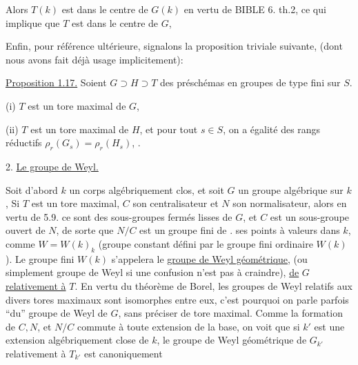 Alors $T(k)$ est dans le centre de $G(k)$ en vertu de BIBLE 6. th.2, ce qui implique que $T$ est dans le centre de $G$, 

Enfin, pour référence ultérieure, signalons la proposition triviale suivante, (dont nous avons fait déjà usage implicitement):

\uline{Proposition 1.17.} Soient $G\supset H\supset T$ des préschémas en groupes de type fini sur $S$. 

(i)  $T$ est un tore maximal de $G$, 

(ii)  $T$ est un tore maximal de $H$, et  pour tout $s\in S$, on a égalité des rangs réductifs $\rho_r(G_s)=\rho_r(H_s)$, .

2. \uline{Le groupe de Weyl.}

Soit d'abord $k$ un corps algébriquement clos, et soit $G$ un groupe algébrique sur $k$,  Si $T$ est un tore maximal, $C$ son centralisateur et $N$ son normalisateur, alors en vertu de  5.9. ce sont des sous-groupes fermés lisses de $G$,  et $C$ est un sous-groupe ouvert de $N$, de sorte que  $N/C$ est un groupe fini  de . ses points à valeurs dans $k$, comme $W=W(k)_k$ (groupe constant défini par le groupe fini ordinaire $W(k)$). Le groupe fini $W(k)$ s'appelera le \uline{groupe de Weyl géométrique}, (ou simplement groupe de Weyl si une confusion n'est pas à craindre), \uline{de} $G$ \uline{relativement à} $T$. En vertu du théorème de  Borel, les groupes de Weyl relatifs aux divers tores maximaux sont isomorphes entre eux, c'est pourquoi on parle parfois ``du'' groupe de Weyl de $G$, sans préciser de tore maximal.  Comme la formation de $C,N$, et $N/C$ commute à toute extension de la base, on voit que si $k'$ est une extension algébriquement close de $k$, le groupe de Weyl géométrique de $G_{k'}$ relativement à $T_{k'}$ est canoniquement 
